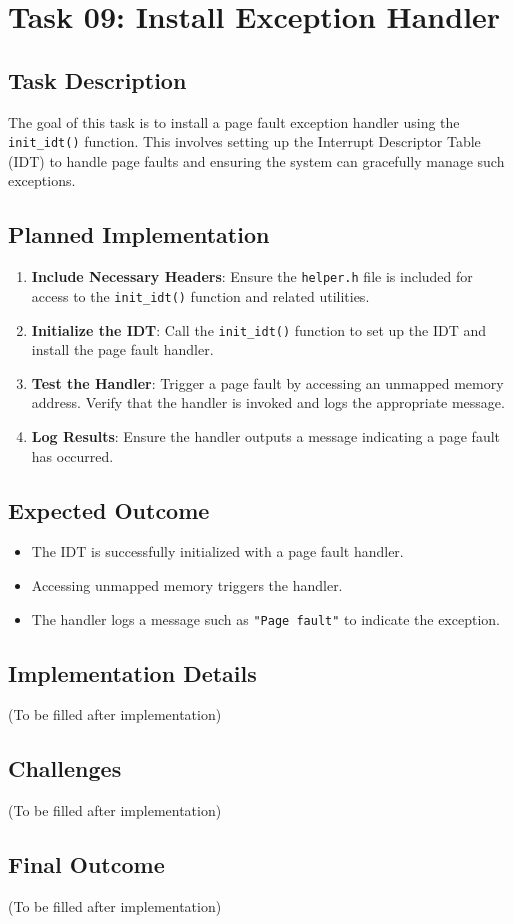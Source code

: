\documentclass[a4paper,12pt]{report}
\begin{document}
\chapter{Task 09: Install Exception Handler}

\section{Task Description}
The goal of this task is to install a page fault exception handler using the \texttt{init\_idt()} function. This involves setting up the Interrupt Descriptor Table (IDT) to handle page faults and ensuring the system can gracefully manage such exceptions.

\section{Planned Implementation}
\begin{enumerate}
    \item \textbf{Include Necessary Headers}:
    Ensure the \texttt{helper.h} file is included for access to the \texttt{init\_idt()} function and related utilities.

    \item \textbf{Initialize the IDT}:
    Call the \texttt{init\_idt()} function to set up the IDT and install the page fault handler.

    \item \textbf{Test the Handler}:
    Trigger a page fault by accessing an unmapped memory address. Verify that the handler is invoked and logs the appropriate message.

    \item \textbf{Log Results}:
    Ensure the handler outputs a message indicating a page fault has occurred.
\end{enumerate}

\section{Expected Outcome}
\begin{itemize}
    \item The IDT is successfully initialized with a page fault handler.
    \item Accessing unmapped memory triggers the handler.
    \item The handler logs a message such as \texttt{"Page fault"} to indicate the exception.
\end{itemize}

\section{Implementation Details}
(To be filled after implementation)

\section{Challenges}
(To be filled after implementation)

\section{Final Outcome}
(To be filled after implementation)
\end{document}
